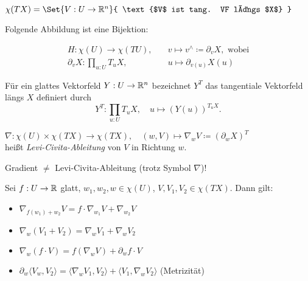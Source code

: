 \documentclass{cheat-sheet}
\begin{document}
\begin{nota}
  $\chi(TX) = \Set{ V : U \to \R^n }{ \text{$V$ ist tang. VF längs $X$} }$
\end{nota}

\begin{bem}
  Folgende Abbildung ist eine Bijektion:

  \begin{align*}
     H : \chi(U) \to \chi(TU), \quad &v \mapsto v^{\wedge} \coloneqq \partial_v X, \text{ wobei}\\
     \partial_v X : \prod_{u : U} T_u X, \quad &u \mapsto \partial_{v(u)} X(u)
   \end{align*} 
\end{bem}

\begin{nota}
  Für ein glattes Vektorfeld $Y : U \to \mathbb{R}^n$ bezeichnet $Y^T$ das tangentiale Vektorfeld längs $X$ definiert durch
  \[ Y^T : \prod_{u : U} T_u X, \quad u \mapsto (Y(u))^{T_u X}. \]
\end{nota}

\begin{defn}
  $\nabla : \chi(U) \times \chi(TX) \to \chi(TX), \quad (w, V) \mapsto \nabla_w V \coloneqq (\partial_w X)^T$\\
  heißt \emph{Levi-Civita-Ableitung} von $V$ in Richtung $w$.
\end{defn}

\begin{acht}
  Gradient $\not=$ Levi-Civita-Ableitung (trotz Symbol $\nabla$)!
\end{acht}

\begin{satz}
  Sei $f : U \to \mathbb{R}$ glatt, $w_1, w_2, w \in \chi(U)$, $V, V_1, V_2 \in \chi(TX)$. Dann gilt:
  \begin{itemize}
    \item $\nabla_{f(w_1) + w_2} V = f \cdot \nabla_{w_1} V + \nabla_{w_2} V$
    \item $\nabla_w (V_1 + V_2) = \nabla_w V_1 + \nabla_w V_2$
    \item $\nabla_w (f \cdot V) = f (\nabla_w V) + \partial_w f \cdot V $
    \item $\partial_w \langle V_w, V_2 \rangle = \langle \nabla_w V_1 , V_2 \rangle + \langle V_1 , \nabla_w V_2 \rangle$ (Metrizität)
  \end{itemize}
\end{satz}

\end{document}
